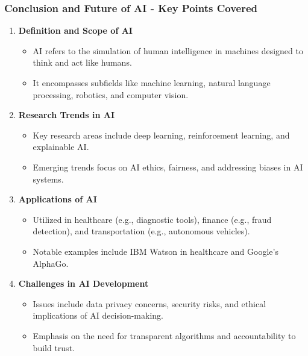 \documentclass[aspectratio=169]{beamer}
\begin{document}
\begin{frame}[fragile]
    \frametitle{Conclusion and Future of AI - Key Points Covered}
    
    \begin{enumerate}
        \item \textbf{Definition and Scope of AI}
            \begin{itemize}
                \item AI refers to the simulation of human intelligence in machines designed to think and act like humans.
                \item It encompasses subfields like machine learning, natural language processing, robotics, and computer vision.
            \end{itemize}
        
        \item \textbf{Research Trends in AI}
            \begin{itemize}
                \item Key research areas include deep learning, reinforcement learning, and explainable AI.
                \item Emerging trends focus on AI ethics, fairness, and addressing biases in AI systems.
            \end{itemize}
        
        \item \textbf{Applications of AI}
            \begin{itemize}
                \item Utilized in healthcare (e.g., diagnostic tools), finance (e.g., fraud detection), and transportation (e.g., autonomous vehicles).
                \item Notable examples include IBM Watson in healthcare and Google's AlphaGo.
            \end{itemize}
        
        \item \textbf{Challenges in AI Development}
            \begin{itemize}
                \item Issues include data privacy concerns, security risks, and ethical implications of AI decision-making.
                \item Emphasis on the need for transparent algorithms and accountability to build trust.
            \end{itemize}
    \end{enumerate}
\end{frame}
\end{document}
